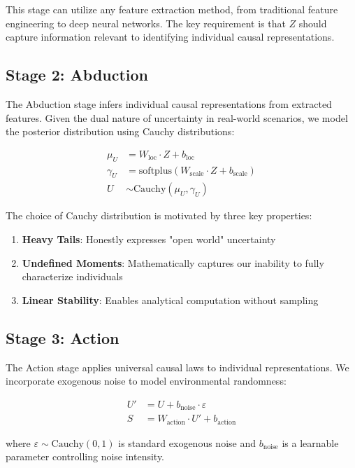 \documentclass[conference]{IEEEtran}
\newcommand{\cauchy}{\text{Cauchy}}
\begin{document}
This stage can utilize any feature extraction method, from traditional feature engineering to deep neural networks. The key requirement is that $Z$ should capture information relevant to identifying individual causal representations.

\subsection{Stage 2: Abduction}

The Abduction stage infers individual causal representations from extracted features. Given the dual nature of uncertainty in real-world scenarios, we model the posterior distribution using Cauchy distributions:

\begin{align}
\mu_U &= W_{\text{loc}} \cdot Z + b_{\text{loc}} \\
\gamma_U &= \text{softplus}(W_{\text{scale}} \cdot Z + b_{\text{scale}}) \\
U &\sim \cauchy(\mu_U, \gamma_U)
\end{align}

The choice of Cauchy distribution is motivated by three key properties:
\begin{enumerate}
\item \textbf{Heavy Tails}: Honestly expresses "open world" uncertainty
\item \textbf{Undefined Moments}: Mathematically captures our inability to fully characterize individuals
\item \textbf{Linear Stability}: Enables analytical computation without sampling
\end{enumerate}

\subsection{Stage 3: Action}

The Action stage applies universal causal laws to individual representations. We incorporate exogenous noise to model environmental randomness:

\begin{align}
U' &= U + b_{\text{noise}} \cdot \varepsilon \\
S &= W_{\text{action}} \cdot U' + b_{\text{action}}
\end{align}

where $\varepsilon \sim \cauchy(0, 1)$ is standard exogenous noise and $b_{\text{noise}}$ is a learnable parameter controlling noise intensity.
\end{document}
